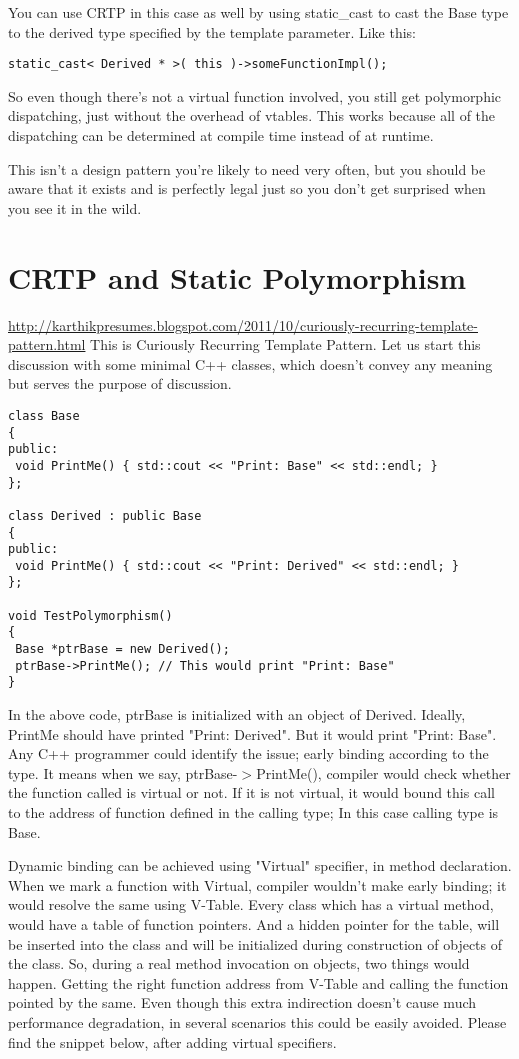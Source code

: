\documentclass{book}
\begin{document}
You can use CRTP in this case as well by using static\_cast to cast the Base type to the derived type specified by the template parameter. Like this:
\begin{lstlisting}
static_cast< Derived * >( this )->someFunctionImpl();
\end{lstlisting}

So even though there’s not a virtual function involved, you still get polymorphic dispatching, just without the overhead of vtables.
This works because all of the dispatching can be determined at compile time instead of at runtime.

This isn’t a design pattern you’re likely to need very often, but you should be aware that it exists and is perfectly legal just so you don’t get surprised when you see it in the wild.

\chapter{CRTP and Static Polymorphism}\label{CRTP}\mbox{}
\url{http://karthikpresumes.blogspot.com/2011/10/curiously-recurring-template-pattern.html}
This is Curiously Recurring Template Pattern. Let us start this discussion with some minimal C++ classes, which doesn't convey any meaning but serves the purpose of discussion.
\begin{lstlisting}
class Base
{
public:
 void PrintMe() { std::cout << "Print: Base" << std::endl; }
};

class Derived : public Base
{
public:
 void PrintMe() { std::cout << "Print: Derived" << std::endl; }
};

void TestPolymorphism()
{
 Base *ptrBase = new Derived();
 ptrBase->PrintMe(); // This would print "Print: Base"
}
\end{lstlisting}

In the above code, ptrBase is initialized with an object of Derived. Ideally, PrintMe should have printed "Print: Derived".
But it would print "Print: Base". Any C++ programmer could identify the issue; early binding according to the type.
It means when we say, ptrBase-$>$PrintMe(), compiler would check whether the function called is virtual or not.
If it is not virtual, it would bound this call to the address of function defined in the calling type; In this case calling type is Base.

Dynamic binding can be achieved using "Virtual" specifier, in method declaration.
When we mark a function with Virtual, compiler wouldn't make early binding; it would resolve the same using V-Table.
Every class which has a virtual method, would have a table of function pointers.
And a hidden pointer for the table, will be inserted into the class and will be initialized during construction of objects of the class.
So, during a real method invocation on objects, two things would happen.
Getting the right function address from V-Table and calling the function pointed by the same.
Even though this extra indirection doesn't cause much performance degradation, in several scenarios this could be easily avoided.
Please find the snippet below, after adding virtual specifiers.
\end{document}
